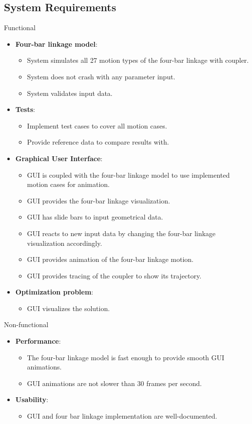 \documentclass{article}
\begin{document}
\subsection{System Requirements}
Functional
\begin{itemize}
	\item \textbf{Four-bar linkage model}:
	\begin{itemize}
		\item System simulates all 27 motion types of the four-bar linkage with coupler.
		\item System does not crash with any parameter input.
		\item System validates input data.
	\end{itemize}
	\item \textbf{Tests}:
	\begin{itemize}
		\item Implement test cases to cover all motion cases.
		\item Provide reference data to compare results with.
	\end{itemize}
	\item \textbf{Graphical User Interface}:
	\begin{itemize}
		\item GUI is coupled with the four-bar linkage model to use implemented motion cases for animation. 
		\item GUI provides the four-bar linkage visualization.
		\item GUI has slide bars to input geometrical data.
		\item GUI reacts to new input data by changing the four-bar linkage visualization accordingly.
		\item GUI provides animation of the four-bar linkage motion.
		\item GUI provides tracing of the coupler to show its trajectory.
	\end{itemize}
	\item \textbf{Optimization problem}:
	\begin{itemize}
		\item GUI visualizes the solution.
	\end{itemize}
\end{itemize}
Non-functional
\begin{itemize}
	\item \textbf{Performance}:
	\begin{itemize}
		\item The four-bar linkage model is fast enough to provide smooth GUI animations.
		\item GUI animations are not slower than 30 frames per second.
	\end{itemize}
	\item \textbf{Usability}:
	\begin{itemize}
		\item GUI and four bar linkage implementation are well-documented.
	\end{itemize}
\end{itemize}
\end{document}
